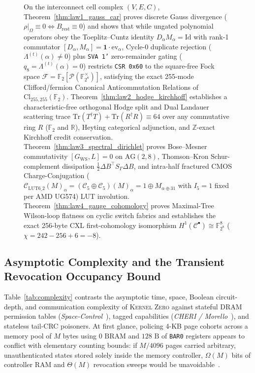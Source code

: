 \documentclass[11pt,letterpaper]{article}
\theoremstyle{spectralthm}
\begin{document}
\begin{figure}[!htp]
{{\begin{minipage}{\dimexpr\textwidth-2\fboxsep-2\fboxrule\relax}
{    On the interconnect cell complex $(V,E,C)$, Theorem~\ref{thm:law1_gauss_car} proves discrete Gauss divergence ($\rho|_{\Omega}\equiv 0 \allowbreak\iff B_{\mathrm{rest}}\equiv 0$) and shows that while ungated polynomial operators obey the Toeplitz--Cuntz identity $D_\alpha M_\alpha=\mathrm{Id}$ with rank-1 commutator $[D_\alpha,M_\alpha]=\mathbf{1}\cdot\mathrm{ev}_\alpha$, Cycle-0 duplicate rejection ($\Lambda^{(t)}(\alpha)\neq 0$) plus \texttt{SVA~1'} zero-remainder gating ($q_8=\Lambda^{(t)}(\alpha)=0$) restricts \texttt{CSR 0x60} to the square-free Fock space $\mathcal{F}=\mathbb{F}_2[\mathcal{P}(\mathbb{F}_{2^8}^\times)]$, satisfying the exact 255-mode Clifford/fermion Canonical Anticommutation Relations of $\mathrm{Cl}_{255,255}(\mathbb{F}_2)$. Theorem~\ref{thm:law2_hodge_kirchhoff} establishes a characteristic-free orthogonal Hodge split and Dual Landauer scattering trace $\mathrm{Tr}(T^\dagger T)\allowbreak+\mathrm{Tr}(R^\dagger R)\equiv 64$ over any commutative ring $R$ ($\mathbb{F}_2$ and $\mathbb{R}$), Heyting categorical adjunction, and $\mathbb{Z}$-exact Kirchhoff credit conservation. Theorem~\ref{thm:law3_spectral_dirichlet} proves Bose--Mesner commutativity $[G_{\mathrm{WS}},L]=0$ on $\mathrm{AG}(2,8)$, Thomson--Kron Schur-complement dissipation $\frac{1}{2}\Delta B^\top S_\Gamma\Delta B$, and intra-half fractured CMOS Charge-Conjugation ($\mathcal{C}_{\mathrm{LUT6\_2}}(M)_\alpha \allowbreak= (\mathcal{C}_5\oplus\mathcal{C}_5)(M)_\alpha \allowbreak= 1\oplus M_{\alpha\oplus 31}$ with $I_5=1$ fixed per AMD UG574) LUT involution. Theorem~\ref{thm:law4_gauge_cohomology} proves Maximal-Tree Wilson-loop flatness on cyclic switch fabrics and establishes the exact 256-byte CXL first-cohomology isomorphism $H^1(\mathcal{C}^\bullet)\cong\mathbb{F}_{2^8}^8$ ($\chi=242-256+6=-8$).}
  \end{minipage}}%
}
\vspace{2pt}
\end{figure}

\subsection{Asymptotic Complexity and the Transient Revocation Occupancy Bound}
\label{sec:complexity_silicon}
Table~\ref{tab:complexity} contrasts the asymptotic time, space, Boolean circuit-depth, and communication complexity of \textsc{Kernel Zero} against stateful DRAM permission tables (\textit{Space-Control}~\cite{goswami2026spacecontrol}), tagged capabilities (\textit{CHERI / Morello}~\cite{woodruff2014cheri, watson2015cheri}), and stateless tail-CRC poisoners. At first glance, policing 4-KB page cohorts across a memory pool of $M$ bytes using $0\text{~BRAM}$ and $128\text{~B}$ of \texttt{BAR0} registers appears to conflict with elementary counting bounds: if $M/4096$ pages carried arbitrary, unauthenticated states stored solely inside the memory controller, $\Omega(M)$ bits of controller RAM and $\Theta(M)$ revocation sweeps would be unavoidable~\cite{goswami2026spacecontrol, filardo2020cornucopia, filardo2024cornucopiareloaded}.
\end{document}
